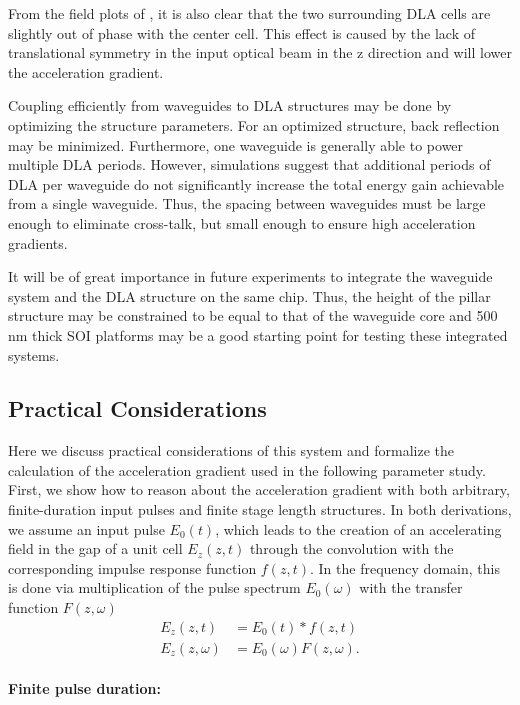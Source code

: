 From the field plots of , it is also clear that the two surrounding DLA cells are slightly out of phase with the center cell.
This effect is caused by the lack of translational symmetry in the input optical beam in the z direction and will lower the acceleration gradient.

Coupling efficiently from waveguides to DLA structures may be done by optimizing the structure parameters.
For an optimized structure, back reflection may be minimized.
Furthermore, one waveguide is generally able to power multiple DLA periods.
However, simulations suggest that additional periods of DLA per waveguide do not significantly increase the total energy gain achievable from a single waveguide.
Thus, the spacing between waveguides must be large enough to eliminate cross-talk, but small enough to ensure high acceleration gradients.

It will be of great importance in future experiments to integrate the waveguide system and the DLA structure on the same chip.
Thus, the height of the pillar structure may be constrained to be equal to that of the waveguide core and 500 nm thick SOI platforms may be a good starting point for testing these integrated systems.

\subsection{Practical Considerations}

Here we discuss practical considerations of this system and formalize the calculation of the acceleration gradient used in the following parameter study.  First, we show how to reason about the acceleration gradient with both arbitrary, finite-duration input pulses and finite stage length structures.  In both derivations, we assume an input pulse $E_0(t)$, which leads to the creation of an accelerating field in the gap of a unit cell $E_z(z,t)$ through the convolution with the corresponding impulse response function $f(z,t)$. In the frequency domain, this is done via multiplication of the pulse spectrum $E_0(\omega)$ with the transfer function $F(z,\omega)$
\begin{align}
 E_z(z,t) &= E_0(t) \ast f(z,t)\\
 E_z(z,\omega) &= E_0(\omega) F(z,\omega).
\end{align}

\paragraph{Finite pulse duration:}

